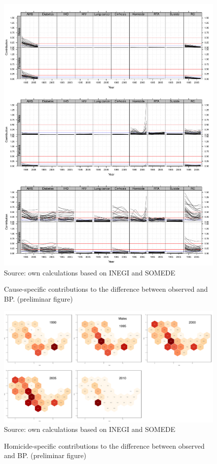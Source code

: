 \documentclass{article}
\begin{document}
\begin{figure}
\caption{Cause-specific contributions to the difference between observed and BP. (preliminar figure)}
\centering
\includegraphics[scale=.5]{Figures/TLE_Decomp.pdf}
Source: own calculations based on INEGI and SOMEDE
\end{figure}

\begin{figure}[\textwidth]
\caption{Homicide-specific contributions to the difference between observed and BP. (preliminar figure)}
\centering
\includegraphics[scale=.4]{Figures/HexMex_maps_homicide.pdf}
Source: own calculations based on INEGI and SOMEDE
\end{figure}
\end{document}
